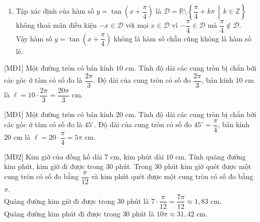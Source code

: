\begin{bt}
{\begin{enumerate}
			Đặt $f(x)=|x|+\tan x$. Xét hai giá trị $\dfrac{\pi}{4}$ và $-\dfrac{\pi}{4}$ thuộc $\mathscr{D}$, ta có
			$$
			f\left(\dfrac{\pi}{4}\right)=\left|\dfrac{\pi}{4}\right|+\tan \dfrac{\pi}{4}=\dfrac{\pi}{4}+1 \text { và } f\left(-\dfrac{\pi}{4}\right)=\left|-\dfrac{\pi}{4}\right|+\tan \left(-\dfrac{\pi}{4}\right)=\dfrac{\pi}{4}-1.
			$$		
			Do $f\left(-\dfrac{\pi}{4}\right) \neq f\left(\dfrac{\pi}{4}\right)$ và $f\left(-\dfrac{\pi}{4}\right) \neq-f\left(\dfrac{\pi}{4}\right)$ nên $y=|x|+\tan x$ không là hàm số chẵn cũng không là hàm số lẻ.
			\item Tập xác định của hàm số $y=\tan \left(x+\dfrac{\pi}{4}\right)$ là $\mathscr{D}=\mathbb{R} \setminus \left\{\dfrac{\pi}{4}+k \pi \,\middle|\, k \in \mathbb{Z}\right\}$ không thoả mãn điều kiện $-x \in \mathscr{D}$ với mọi $x \in \mathscr{D}$ vì $-\dfrac{\pi}{4} \in \mathscr{D}$ mà $\dfrac{\pi}{4} \notin \mathscr{D}$.\\
			Vậy hàm số $y=\tan \left(x+\dfrac{\pi}{4}\right)$ không là hàm số chẵn cũng không là hàm số lẻ.
		\end{enumerate}
	}
\end{bt}

\begin{bt}%
[MĐ1]
	Một đường tròn có bán kính $10$ cm. Tính độ dài các cung tròn bị chắn bởi các góc ở tâm có số đo là $\dfrac{2\pi}{3}$.
	\loigiai
	{
		Độ dài của cung tròn có số đo $\dfrac{2\pi}{3}$, bán kính $10$ cm là $\ell = 10 \cdot \dfrac{2\pi}{3} = \dfrac{20\pi}{3}$ cm.
	}
\end{bt}

\begin{bt}%
[MĐ1]
	Một đường tròn có bán kính $20$ cm. Tính độ dài các cung tròn bị chắn bởi các góc ở tâm có số đo là $45^\circ$.
	\loigiai
	{
		Độ dài của cung tròn có số đo $45^\circ = \dfrac{\pi}{4}$, bán kính $20$ cm là $\ell = 20 \cdot \dfrac{\pi}{4} = 5\pi$ cm.
	}
\end{bt}

\begin{bt}%
[MĐ2]
	Kim giờ của đồng hồ dài $7$ cm, kim phút dài $10$ cm. Tính quãng đường kim phút, kim giờ đi được trong $30$ phút.
	\loigiai
	{
		Trong $30$ phút kim giờ quét được một cung tròn có số đo bằng $\dfrac{\pi}{12}$ và kim phút quét được một cung tròn có số đo bằng $\pi$.\\
		Quãng đường kim giờ đi được trong $30$ phút là $7\cdot \dfrac{\pi}{12} = \dfrac{7\pi}{12} \approx 1{,}83$ cm.\\
		Quãng đường kim phút đi được trong $30$ phút là $10 \pi \approx 31{,}42$ cm.
	}
\end{bt}

